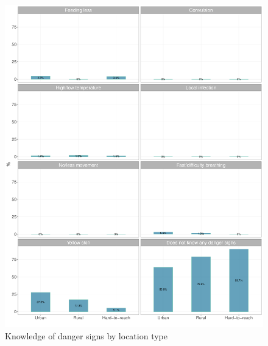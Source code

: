 \documentclass[12pt,a4paper]{article}
\begin{document}
\begin{figure}[H]

{\centering \includegraphics{kayinReport_files/figure-latex/nbc7Plot-1} 

}

\caption{Knowledge of danger signs by location type}\label{fig:nbc7Plot}
\end{figure}
\end{document}

